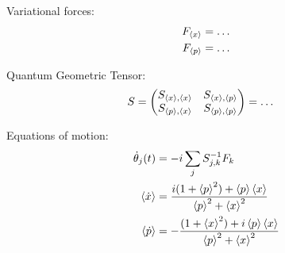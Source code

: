 \documentclass[aps,pre,superscriptaddress,amsmath,amssymb,amsfonts,twocolumn,showpacs,notitlepage]{revtex4-1}
\begin{document}
	Variational forces:
	\begin{align}
		F_{\ev{x}} &= \dots
		\\
		F_{\ev{p}} &= \dots
	\end{align}
	
	Quantum Geometric Tensor:
	\begin{align}
		S &=\mqty(  S_{\ev{x},\ev{x}}  & S_{\ev{x},\ev{p}} \\ 
					S_{\ev{p},\ev{x}}  & S_{\ev{p},\ev{p}})
		=\dots
	\end{align}
	
	Equations of motion:
	\begin{align}
		\dot{\theta}_j(t) &= -i\sum_{j}S_{j,k}^{-1}F_{k}
		\\
		\ev{\dot{x}} &= \frac{i(1+\ev{p}^2)+\ev{p}\ev{x}}{\ev{p}^2 + \ev{x}^2}
		\\
		\ev{\dot{p}} &= -\frac{(1+\ev{x}^2)+i\ev{p}\ev{x}}{\ev{p}^2 + \ev{x}^2}
	\end{align}




\newpage
\listoftodos[Notes]
	
\end{document}
